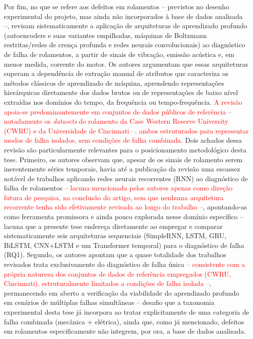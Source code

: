 \documentclass[times,final]{elsarticle}
\begin{document}
Por fim, no que se refere aos defeitos em rolamentos -- previstos no desenho experimental do projeto, mas ainda não incorporados à base de dados analisada --, \citet{hoang2019} revisam sistematicamente a aplicação de arquiteturas de aprendizado profundo (autoencoders e suas variantes empilhadas, máquinas de Boltzmann restritas/redes de crença profunda e redes neurais convolucionais) ao diagnóstico de falha de rolamentos, a partir de sinais de vibração, emissão acústica e, em menor medida, corrente do motor. Os autores argumentam que essas arquiteturas superam a dependência de extração manual de atributos que caracteriza os métodos clássicos de aprendizado de máquina, aprendendo representações hierárquicas diretamente dos dados brutos ou de representações de baixo nível extraídas nos domínios do tempo, da frequência ou tempo-frequência. \textcolor{red}{A revisão apoia-se predominantemente em conjuntos de dados públicos de referência -- notadamente os \textit{datasets} de rolamento da Case Western Reserve University (CWRU) e da Universidade de Cincinnati --, ambos estruturados para representar modos de falha isolados, sem condições de falha combinada.} Dois achados dessa revisão são particularmente relevantes para o posicionamento metodológico desta tese. Primeiro, os autores observam que, apesar de os sinais de rolamento serem inerentemente séries temporais, havia até a publicação da revisão uma escassez notável de trabalhos aplicando redes neurais recorrentes (RNN) ao diagnóstico de falha de rolamentos\textcolor{red}{ -- lacuna mencionada pelos autores apenas como direção futura de pesquisa, na conclusão do artigo, sem que nenhuma arquitetura recorrente tenha sido efetivamente revisada ao longo do trabalho --}, apontando-as como ferramenta promissora e ainda pouco explorada nesse domínio específico -- lacuna que a presente tese endereça diretamente ao empregar e comparar sistematicamente seis arquiteturas sequenciais (SimpleRNN, LSTM, GRU, BiLSTM, CNN+LSTM e um Transformer temporal) para o diagnóstico de falha (RQ1). Segundo, os autores apontam que a quase totalidade dos trabalhos revisados trata exclusivamente do diagnóstico de falha única\textcolor{red}{ -- consistente com a própria natureza dos conjuntos de dados de referência empregados (CWRU, Cincinnati), estruturalmente limitados a condições de falha isolada --}, permanecendo em aberto a verificação da viabilidade do aprendizado profundo em cenários de múltiplas falhas simultâneas -- desafio que a taxonomia experimental desta tese já incorpora ao tratar explicitamente de uma categoria de falha combinada (mecânica + elétrica), ainda que, como já mencionado, defeitos em rolamentos especificamente não integrem, por ora, a base de dados analisada.
\end{document}
